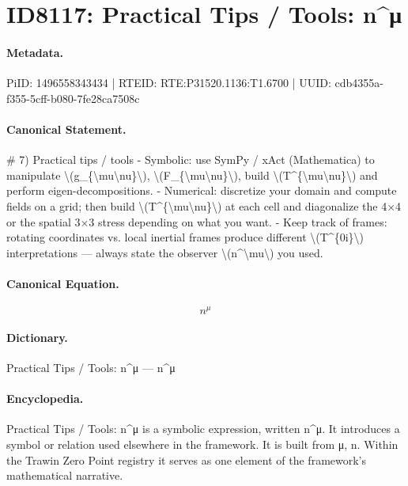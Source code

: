 \section*{ID8117: Practical Tips / Tools: n\textasciicircum{}μ}
\paragraph{Metadata.}
PiID: 1496558343434 | RTEID: RTE:P31520.1136:T1.6700 | UUID: cdb4355a-f355-5cff-b080-7fe28ca7508c

\paragraph{Canonical Statement.}
\# 7) Practical tips / tools - Symbolic: use SymPy / xAct (Mathematica) to manipulate \textbackslash{}(g\_\{\textbackslash{}mu\textbackslash{}nu\}\textbackslash{}), \textbackslash{}(F\_\{\textbackslash{}mu\textbackslash{}nu\}\textbackslash{}), build \textbackslash{}(T\textasciicircum{}\{\textbackslash{}mu\textbackslash{}nu\}\textbackslash{}) and perform eigen-decompositions. - Numerical: discretize your domain and compute fields on a grid; then build \textbackslash{}(T\textasciicircum{}\{\textbackslash{}mu\textbackslash{}nu\}\textbackslash{}) at each cell and diagonalize the 4×4 or the spatial 3×3 stress depending on what you want. - Keep track of frames: rotating coordinates vs. local inertial frames produce different \textbackslash{}(T\textasciicircum{}\{0i\}\textbackslash{}) interpretations — always state the observer \textbackslash{}(n\textasciicircum{}\textbackslash{}mu\textbackslash{}) you used.

\paragraph{Canonical Equation.}
\[
n^\mu
\]

\paragraph{Dictionary.}
Practical Tips / Tools: n\textasciicircum{}μ — n\textasciicircum{}μ

\paragraph{Encyclopedia.}
Practical Tips / Tools: n\textasciicircum{}μ is a symbolic expression, written n\textasciicircum{}μ. It introduces a symbol or relation used elsewhere in the framework. It is built from μ, n. Within the Trawin Zero Point registry it serves as one element of the framework's mathematical narrative.
